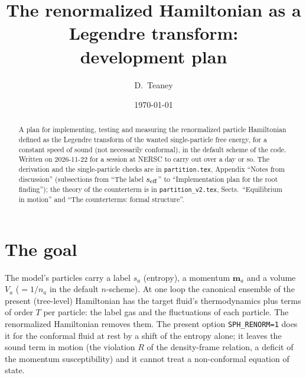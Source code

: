 \documentclass[11pt,aps,preprint,nofootinbib,superscriptaddress,tightenlines]{revtex4-2}
\begin{document}
\sloppy

\title{The renormalized Hamiltonian as a Legendre transform:\\ development plan}
\author{D.~Teaney}
\date{\today}

\begin{abstract}
A plan for implementing, testing and measuring the renormalized particle Hamiltonian defined as the Legendre transform of the wanted single-particle
free energy, for a constant speed of sound (not necessarily conformal), in the default scheme of the code.  Written on 2026-11-22 for a session at
NERSC to carry out over a day or so.  The derivation and the single-particle checks are in \nolinkurl{partition.tex}, Appendix ``Notes from
discussion'' (subsections from ``The label $s_{\rm eff}$'' to ``Implementation plan for the root finding''); the theory of the counterterm is in
\nolinkurl{partition_v2.tex}, Sects.~``Equilibrium in motion'' and ``The counterterms: formal structure''.
\end{abstract}

\maketitle
\tableofcontents

\section{The goal}
\label{sec:goal}

The model's particles carry a label $s_a$ (entropy), a momentum $\bm m_a$ and a volume $V_a$ ($=1/n_a$ in the default $n$-scheme).  At one loop the
canonical ensemble of the present (tree-level) Hamiltonian has the target fluid's thermodynamics plus terms of order $T$ per particle: the label gas
and the fluctuations of each particle.  The renormalized Hamiltonian removes them.  The present option \texttt{SPH\_RENORM=1} does it for the conformal
fluid at rest by a shift of the entropy alone; it leaves the sound term in motion (the violation $R$ of the density-frame relation, a deficit of the
momentum susceptibility) and it cannot treat a non-conformal equation of state.
\end{document}
